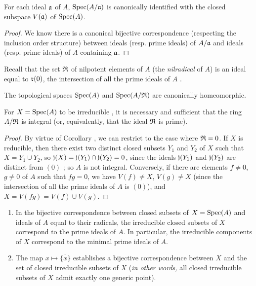 \begin{prop}[1.1.11]
\label{1.1.1.11}
For each ideal $\mathfrak{a}$ of $A$, ${\mathop{\mathrm{Spec}}\nolimits}(A/\mathfrak{a})$ is canonically identified with the closed subspace $V(\mathfrak{a})$ of ${\mathop{\mathrm{Spec}}\nolimits}(A)$.
\end{prop}

\begin{proof}
\label{proof-1.1.1.11}
We know there is a canonical bijective correspondence (respecting the inclusion order structure) between ideals (resp. prime ideals) of $A/\mathfrak{a}$ and ideals (resp. prime ideals) of $A$ containing $\mathfrak{a}$.
\end{proof}

Recall that the set $\mathfrak{R}$ of nilpotent elements of $A$ (the \emph{nilradical} of $A$) is an ideal equal to $\mathfrak{r}(0)$, the intersection of all the prime ideals of $A$ .

\begin{cor}[1.1.12]
\label{1.1.1.12}
The topological spaces ${\mathop{\mathrm{Spec}}\nolimits}(A)$ and ${\mathop{\mathrm{Spec}}\nolimits}(A/\mathfrak{R})$ are canonically homeomorphic.
\end{cor}

\begin{prop}[1.1.13]
\label{1.1.1.13}
For $X={\mathop{\mathrm{Spec}}\nolimits}(A)$ to be irreducible , it is necessary and sufficient that the ring $A/\mathfrak{R}$ is integral (or, equivalently, that the ideal $\mathfrak{R}$ is prime).
\end{prop}

\begin{proof}
\label{proof-1.1.1.13}
By virtue of Corollary , we can restrict to the case where $\mathfrak{R}=0$.
If $X$ is reducible, then there exist two distinct closed subsets $Y_1$ and $Y_2$ of $X$ such that $X=Y_1\cup Y_2$, so $\mathfrak{j}(X)=\mathfrak{j}(Y_1)\cap\mathfrak{j}(Y_2)=0$, since the ideals $\mathfrak{j}(Y_1)$ and $\mathfrak{j}(Y_2)$ are distinct from $(0)$ ;
so $A$ is not integral.
Conversely, if there are elements $f\neq 0$, $g\neq 0$ of $A$ such that $fg=0$, we have $V(f)\neq X$, $V(g)\neq X$ (since the intersection of all the prime ideals of $A$ is $(0)$), and $X=V(fg)=V(f)\cup V(g)$.
\end{proof}

\begin{cor}[1.1.14]
\label{1.1.1.14}
\medskip\noindent
\begin{enumerate}[label=\emph{(\roman*)}]
  \item In the bijective correspondence between closed subsets of $X={\mathop{\mathrm{Spec}}\nolimits}(A)$ and ideals of $A$ equal to their radicals, the irreducible closed subsets of $X$ correspond to the prime ideals of $A$.
    In particular, the irreducible components of $X$ correspond to the minimal prime ideals of $A$.
  \item The map $x\mapsto\overline{\{x\}}$ establishes a bijective correspondence between $X$ and the set of closed irreducible subsets of $X$ (\emph{in other words,} all closed irreducible subsets of $X$ admit exactly one generic point).
\end{enumerate}
\end{cor}

